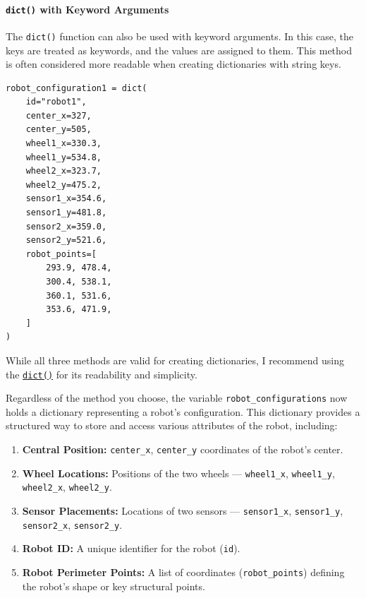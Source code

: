 \paragraph{\texttt{dict()} with Keyword Arguments}

The \texttt{dict()} function can also be used with keyword arguments. In this case, the keys are treated as keywords, and the values are assigned to them. This method is often considered more readable when creating dictionaries with string keys.



\begin{verbatim}
robot_configuration1 = dict(
    id="robot1",
    center_x=327,
    center_y=505,
    wheel1_x=330.3,
    wheel1_y=534.8,
    wheel2_x=323.7,
    wheel2_y=475.2,
    sensor1_x=354.6,
    sensor1_y=481.8,
    sensor2_x=359.0,
    sensor2_y=521.6,
    robot_points=[
        293.9, 478.4,
        300.4, 538.1,
        360.1, 531.6,
        353.6, 471.9,
    ]
)
\end{verbatim}


While all three methods are valid for creating dictionaries, I recommend using the \href{https://github.com/balandongiv/computer_programming_gist/blob/main/session3/robot1_coordinates.py}{\texttt{dict()}} for its readability and simplicity.

Regardless of the method you choose, the variable \texttt{robot\_configurations} now holds a dictionary representing a robot's configuration. This dictionary provides a structured way to store and access various attributes of the robot, including:

\begin{enumerate}
    \item \textbf{Central Position:} \texttt{center\_x}, \texttt{center\_y} coordinates of the robot's center.
    \item \textbf{Wheel Locations:} Positions of the two wheels — \texttt{wheel1\_x}, \texttt{wheel1\_y}, \texttt{wheel2\_x}, \texttt{wheel2\_y}.
    \item \textbf{Sensor Placements:} Locations of two sensors — \texttt{sensor1\_x}, \texttt{sensor1\_y}, \texttt{sensor2\_x}, \texttt{sensor2\_y}.
    \item \textbf{Robot ID:} A unique identifier for the robot (\texttt{id}).
    \item \textbf{Robot Perimeter Points:} A list of coordinates (\texttt{robot\_points}) defining the robot's shape or key structural points.
\end{enumerate}


